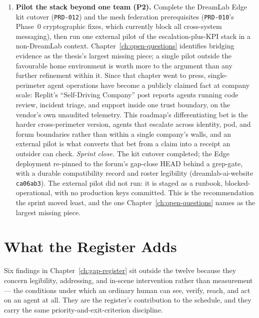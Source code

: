 \begin{enumerate}
  \item \textbf{Pilot the stack beyond one team (P2).} Complete the DreamLab Edge kit cutover (\texttt{PRD-012}) and the mesh federation prerequisites (\texttt{PRD-010}'s Phase~0 cryptographic fixes, which currently block all cross-system messaging), then run one external pilot of the escalation-plus-KPI stack in a non-DreamLab context. Chapter~\ref{ch:open-questions} identifies bridging evidence as the thesis's largest missing piece; a single pilot outside the favourable home environment is worth more to the argument than any further refinement within it. Since that chapter went to press, single-perimeter agent operations have become a publicly claimed fact at company scale: Replit's ``Self-Driving Company'' post \parencite{MasadKennedy2026} reports agents running code review, incident triage, and support inside one trust boundary, on the vendor's own unaudited telemetry. This roadmap's differentiating bet is the harder cross-perimeter version, agents that escalate across identity, pod, and forum boundaries rather than within a single company's walls, and an external pilot is what converts that bet from a claim into a receipt an outsider can check. \emph{Sprint close.} The kit cutover completed; the Edge deployment re-pinned to the forum's gap-close HEAD behind a grep-gate, with a durable compatibility record and roster legibility (dreamlab-ai-website \texttt{ca06ab3}). The external pilot did not run: it is staged as a runbook, blocked-operational, with no production keys committed. This is the recommendation the sprint moved least, and the one Chapter~\ref{ch:open-questions} names as the largest missing piece.
\end{enumerate}

\section{What the Register Adds}

Six findings in Chapter~\ref{ch:gap-register} sit outside the twelve because they concern legibility, addressing, and in-scene intervention rather than measurement --- the conditions under which an ordinary human can see, verify, reach, and act on an agent at all. They are the register's contribution to the schedule, and they carry the same priority-and-exit-criterion discipline.

